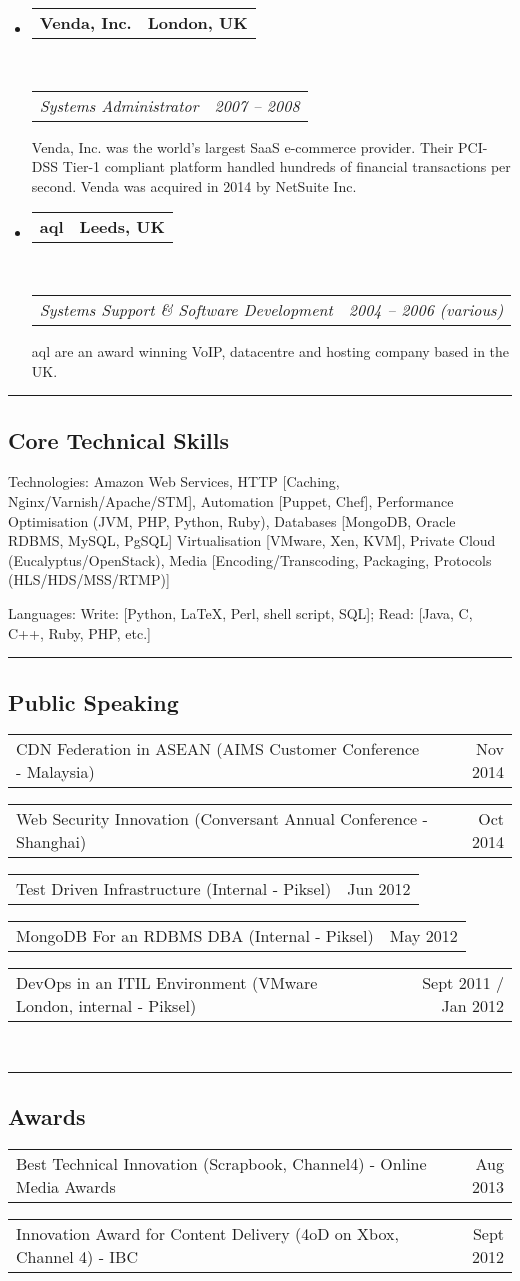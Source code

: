 \documentclass[10pt,a4paper]{article}
\makeatletter
\newenvironment{indentsection}[1]%
{\begin{list}{}%
    {\setlength{\leftmargin}{#1}}%
    \item[]%
}
{\end{list}}
\newcommand{\headerrow}[2]
{\begin{tabular*}{\linewidth}{l@{\extracolsep{\fill}}r}
    #1 &
    #2 \\
\end{tabular*}}
\makeatother
\begin{document}
\begin{itemize}
    \item
        \headerrow
            {\textbf{Venda, Inc.}}
            {\textbf{London, UK}}
        \\
        \headerrow
            {\emph{Systems Administrator}}
            {\emph{2007 -- 2008}}
    
            Venda, Inc. was the world's largest SaaS e-commerce provider. Their PCI-DSS Tier-1 compliant platform handled hundreds of financial transactions per second. Venda was acquired in 2014 by NetSuite Inc.
    \item
        \headerrow
            {\textbf{aql}}
            {\textbf{Leeds, UK}}
        \\
        \headerrow
            {\emph{Systems Support \& Software Development}}
            {\emph{2004 -- 2006 (various)}}
    
            aql are an award winning VoIP, datacentre and hosting company based in the UK.
\end{itemize}


\hrule
\vspace{-0.4em}
\subsection*{Core Technical Skills}

\begin{indentsection}{\parindent}
\begin{description*}
    \item[Technologies:]
    Amazon Web Services, HTTP [Caching, Nginx/Varnish/Apache/STM], Automation [Puppet, Chef], Performance Optimisation (JVM, PHP, Python, Ruby), Databases [MongoDB, Oracle RDBMS, MySQL, PgSQL] Virtualisation [VMware, Xen, KVM], Private Cloud (Eucalyptus/OpenStack), Media [Encoding/Transcoding, Packaging, Protocols (HLS/HDS/MSS/RTMP)]
    \item[Languages:]
    Write: [Python, \LaTeX, Perl, shell script, SQL]; Read: [Java, C, C++, Ruby, PHP, etc.]
\end{description*}
\end{indentsection}

\hrule
\vspace{-0.4em}
\subsection*{Public Speaking}
    \headerrow
        {CDN Federation in ASEAN (AIMS Customer Conference - Malaysia)}
        {Nov 2014}
    \headerrow
        {Web Security Innovation (Conversant Annual Conference - Shanghai)}
        {Oct 2014}
    \headerrow
        {Test Driven Infrastructure (Internal - Piksel)}
        {Jun 2012}
    \headerrow
        {MongoDB For an RDBMS DBA (Internal - Piksel)}
        {May 2012}
    \headerrow
        {DevOps in an ITIL Environment (VMware London, internal - Piksel)}
        {Sept 2011 / Jan 2012}
\\
\hrule
\vspace{-0.4em}
\subsection*{Awards}
    \headerrow
        {Best Technical Innovation (Scrapbook, Channel4) - Online Media Awards}
        {Aug 2013}
    \headerrow
        {Innovation Award for Content Delivery (4oD on Xbox, Channel 4) - IBC}
        {Sept 2012}
\end{document}
